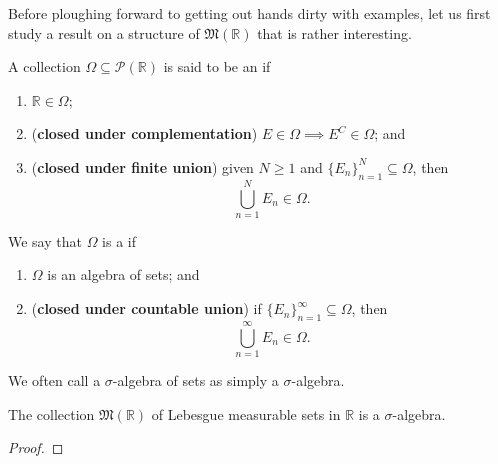 \documentclass[notoc,notitlepage]{tufte-book}
\begin{document}
Before ploughing forward to getting out hands dirty with examples, let us first
study a result on a structure of $\mathfrak{M}(\mathbb{R})$ that is rather
interesting. 

\begin{defn}\label{defn:algebra_of_sets}\label{defn:sigma_algebra_of_sets}
  A collection $\Omega \subseteq \mathcal{P}(\mathbb{R})$ is said to be an
   if
  \begin{enumerate}
    \item $\mathbb{R} \in \Omega$;
    \item (\textbf{closed under complementation}) $E \in \Omega \implies E^C \in
      \Omega$; and
    \item (\textbf{closed under finite union}) given $N \geq 1$ and $\{ E_n
      \}_{n=1}^{N} \subseteq \Omega$, then
      \begin{equation*}
        \bigcup_{n=1}^{N} E_n \in \Omega.
      \end{equation*}
  \end{enumerate}
  We say that $\Omega$ is a  if
  \begin{enumerate}
    \item $\Omega$ is an algebra of sets; and
    \item (\textbf{closed under countable union}) if $\{ E_n \}_{n=1}^{\infty}
      \subseteq \Omega$, then
      \begin{equation*}
        \bigcup_{n=1}^{\infty} E_n \in \Omega.
      \end{equation*}
  \end{enumerate}
\end{defn}

\begin{note}
  We often call a $\sigma$-algebra of sets as simply a $\sigma$-algebra.
\end{note}

\begin{thm}\label{thm:_m_r_is_a_sigma_algebra} 
  The collection $\mathfrak{M}(\mathbb{R})$ of Lebesgue measurable sets in
  $\mathbb{R}$ is a $\sigma$-algebra.
\end{thm}

\begin{proof}
\end{proof}



\appendix

\backmatter

\fancyhead[LE]{\thepage \enspace \textsl{\leftmark}}



\printindex
\end{document}
